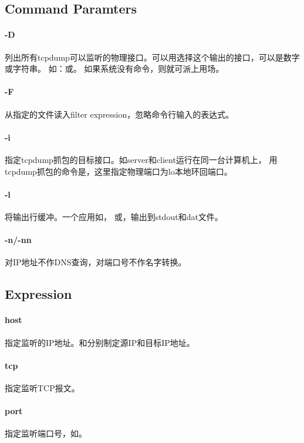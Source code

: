 \subsection{Command Paramters}
\paragraph{-D}列出所有tcpdump可以监听的物理接口。可以用选择这个输出的接口，可以是数字或字符串。
如：或。
如果系统没有命令，则就可派上用场。

\paragraph{-F}从指定的文件读入filter expression，忽略命令行输入的表达式。

\paragraph{-i}指定tcpdump抓包的目标接口。如server和client运行在同一台计算机上，
用tcpdump抓包的命令是，这里指定物理端口为lo本地环回端口。

\paragraph{-l}将输出行缓冲。一个应用如，
或，输出到stdout和dat文件。

\paragraph{-n/-nn}对IP地址不作DNS查询，对端口号不作名字转换。

\subsection{Expression}

\paragraph{host}指定监听的IP地址。和分别制定源IP和目标IP地址。
\paragraph{tcp}指定监听TCP报文。
\paragraph{port}指定监听端口号，如。

